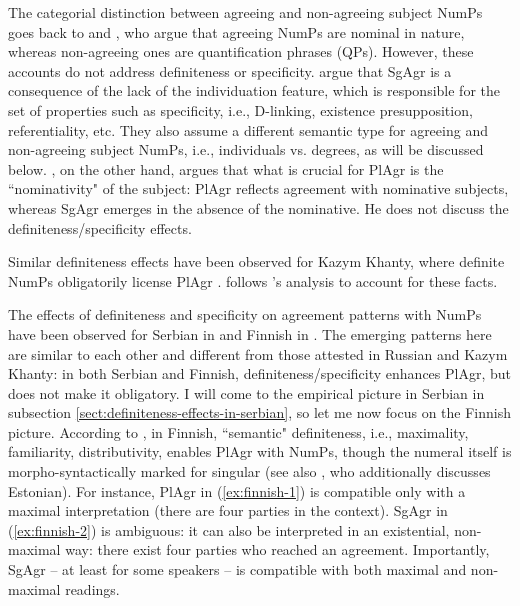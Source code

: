 \documentclass[output=paper,colorlinks,citecolor=brown
]{langscibook}
\begin{document}
\noindent The categorial distinction between agreeing and non-agreeing subject NumPs goes back to \citet{Pesetsky1982} and \citet{Franks1995}, who argue that agreeing NumPs are nominal in nature, whereas non-agreeing ones are quantification phrases (QPs). However, these accounts do not address definiteness or specificity. \citet{Matushansky2014, Matushansky2015a, Matushansky2015} argue that SgAgr is a consequence of the lack of the individuation feature, which is responsible for the set of properties such as specificity, i.e., D-linking, existence presupposition, referentiality, etc. They also assume a different semantic type for agreeing and non-agreeing subject NumPs, i.e., individuals vs. degrees, as will be discussed below. \citet{Boskovic2008, Boskovic2024}, on the other hand, argues that what is crucial for PlAgr is the ``nominativity" of the subject: PlAgr reflects agreement with nominative subjects, whereas SgAgr emerges in the absence of the nominative. He does not discuss the definiteness/specificity effects. 

Similar definiteness effects have been observed for Kazym Khanty, where definite NumPs obligatorily license PlAgr \citep{Pisarenko2024}. \citet{Pisarenko2024} follows \citet{Pereltsvaig2006}'s analysis to account for these facts.

The effects of definiteness and specificity on agreement patterns with NumPs have been observed for Serbian in \citet{Milosavljevic2017, Milosavljevic2018MS, Milosavljevic2018nasledje} and Finnish in \citet{Kaiser2022salt, Kaiser2022short}. The emerging patterns here are similar to each other and different from those attested in Russian and Kazym Khanty: in both Serbian and Finnish, definiteness/specificity enhances PlAgr, but does not make it obligatory. I will come to the empirical picture in Serbian in subsection \ref{sect:definiteness-effects-in-serbian}, so let me now focus on the Finnish picture. According to \citet{Kaiser2022salt, Kaiser2022short}, in Finnish, ``semantic" definiteness, i.e., maximality, familiarity, distributivity, enables PlAgr with NumPs, though the numeral itself is morpho-syntactically marked for singular (see also \citealt{Norris2021}, who additionally discusses Estonian). For instance, PlAgr in (\ref{ex:finnish-1}) is compatible only with a maximal interpretation (there are four parties in the context). SgAgr in (\ref{ex:finnish-2}) is ambiguous: it can also be interpreted in an existential, non-maximal way: there exist four parties who reached an agreement. Importantly, SgAgr -- at least for some speakers -- is compatible with both maximal and non-maximal readings.
\end{document}
